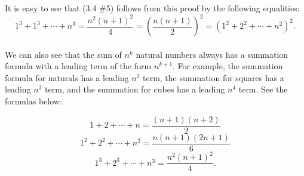 \documentclass[11pt]{article}
\begin{document}
It is easy to see that {(3.4 \#5)} follows from this proof by the following equalities:
$$1^{3} + 1^{3} + \cdots + n^{3} = \frac{n^{2}(n+1)^{2}}{4} = \left(\frac{n(n+1)}{2}\right)^{2} = (1^{2} + 2^{2} + \cdots + n^{2})^{2}.$$ \\

We can also see that the sum of $n^{k}$ natural numbers always has a summation formula with a leading term of the form $n^{k+1}$. For example, the summation formula for naturals has a leading $n^{2}$ term, the summation for squares has a leading $n^{3}$ term, and the summation for cubes has a leading $n^{4}$ term. See the formulas below:

$$1 + 2 + \cdots + n = \frac{(n+1)(n+2)}{2}$$
$$1^{2} + 2^{2} + \cdots + n^{2} = \frac{n(n+1)(2n+1)}{6}$$
$$1^{3} + 2^{3} + \cdots + n^{3} = \frac{n^{2}(n+1)^{2}}{4}.$$
\end{document}

